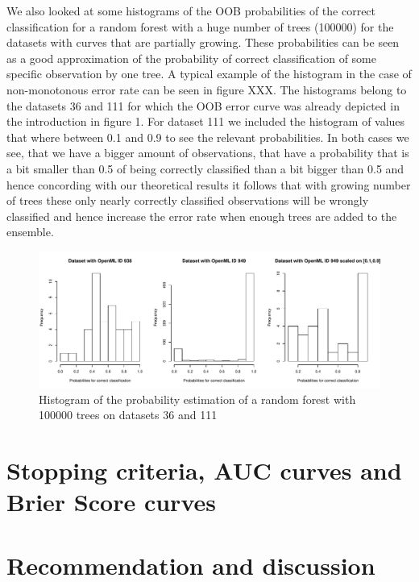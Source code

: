 \documentclass[paper=a4
               ,12pt
               ,DIV=12
               ,parskip=half
               ,titlepage=on
               ,headinclude 
               ,footinclude
               ,headsepline
               ,footsepline         %
               ,ilines 
               ]{scrartcl}
\begin{document}
We also looked at some histograms of the OOB probabilities of the correct classification for a random forest with a huge number of trees (100000) for the datasets with curves that are partially growing. 
These probabilities can be seen as a good approximation of the probability of correct classification of some specific observation by one tree.  
A typical example of the histogram in the case of non-monotonous error rate can be seen in figure XXX. The histograms belong to the datasets 36 and 111 for which the OOB error curve was already depicted in the introduction in figure 1. 
For dataset 111 we included the histogram of values that where between 0.1 and 0.9 to see the relevant probabilities. In both cases we see, that we have a bigger amount of observations, that have a probability that is a bit smaller than 0.5
of being correctly classified than a bit bigger than 0.5 and hence concording with our theoretical results it follows that with growing number of trees these only nearly correctly classified observations will be wrongly classified and hence 
increase the error rate when enough trees are added to the ensemble. 

\begin{figure}[!htb]
\begin{center}
  \includegraphics[width=\textwidth]{histogram.pdf}
  \caption{Histogram of the probability estimation of a random forest with 100000 trees on datasets 36 and 111}
\end{center}
\end{figure}


\section{Stopping criteria, AUC curves and Brier Score curves}


\section{Recommendation and discussion}
\end{document}
